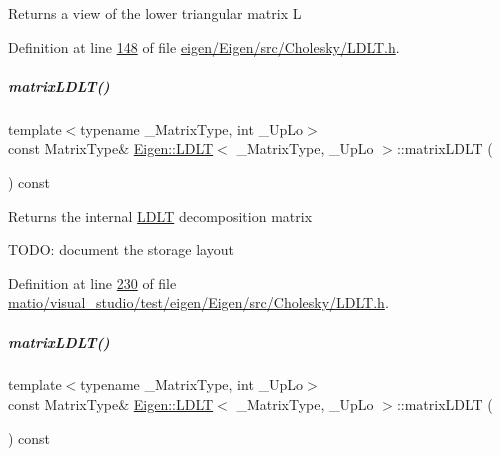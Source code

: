 \begin{DoxyReturn}{Returns}
a view of the lower triangular matrix L 
\end{DoxyReturn}


Definition at line \hyperlink{eigen_2_eigen_2src_2_cholesky_2_l_d_l_t_8h_source_l00148}{148} of file \hyperlink{eigen_2_eigen_2src_2_cholesky_2_l_d_l_t_8h_source}{eigen/\+Eigen/src/\+Cholesky/\+L\+D\+L\+T.\+h}.

\mbox{\label{group___cholesky___module_aa5e0fd09dcd5251a8521fa248b95db0b}} 
\subparagraph{\texorpdfstring{matrix\+L\+D\+L\+T()}{matrixLDLT()}\hspace{0.1cm}{\footnotesize\ttfamily [1/2]}}
{\footnotesize\ttfamily template$<$typename \+\_\+\+Matrix\+Type, int \+\_\+\+Up\+Lo$>$ \\
const Matrix\+Type\& \hyperlink{group___cholesky___module_class_eigen_1_1_l_d_l_t}{Eigen\+::\+L\+D\+LT}$<$ \+\_\+\+Matrix\+Type, \+\_\+\+Up\+Lo $>$\+::matrix\+L\+D\+LT (\begin{DoxyParamCaption}{ }\end{DoxyParamCaption}) const\hspace{0.3cm}{\ttfamily [inline]}}

\begin{DoxyReturn}{Returns}
the internal \hyperlink{group___cholesky___module_class_eigen_1_1_l_d_l_t}{L\+D\+LT} decomposition matrix
\end{DoxyReturn}
T\+O\+DO\+: document the storage layout 

Definition at line \hyperlink{matio_2visual__studio_2test_2eigen_2_eigen_2src_2_cholesky_2_l_d_l_t_8h_source_l00230}{230} of file \hyperlink{matio_2visual__studio_2test_2eigen_2_eigen_2src_2_cholesky_2_l_d_l_t_8h_source}{matio/visual\+\_\+studio/test/eigen/\+Eigen/src/\+Cholesky/\+L\+D\+L\+T.\+h}.

\mbox{\label{group___cholesky___module_aa5e0fd09dcd5251a8521fa248b95db0b}} 
\subparagraph{\texorpdfstring{matrix\+L\+D\+L\+T()}{matrixLDLT()}\hspace{0.1cm}{\footnotesize\ttfamily [2/2]}}
{\footnotesize\ttfamily template$<$typename \+\_\+\+Matrix\+Type, int \+\_\+\+Up\+Lo$>$ \\
const Matrix\+Type\& \hyperlink{group___cholesky___module_class_eigen_1_1_l_d_l_t}{Eigen\+::\+L\+D\+LT}$<$ \+\_\+\+Matrix\+Type, \+\_\+\+Up\+Lo $>$\+::matrix\+L\+D\+LT (\begin{DoxyParamCaption}{ }\end{DoxyParamCaption}) const\hspace{0.3cm}{\ttfamily [inline]}}

